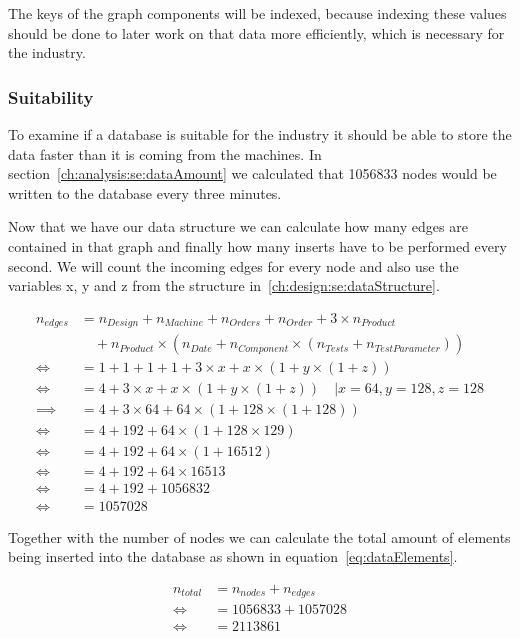 The keys of the graph components will be indexed,
because indexing these values should be done to later work on that data more efficiently,
which is necessary for the industry.

\subsubsection{Suitability}
\label{ch:design:se:suitability}
To examine if a database is suitable for the industry it should be able to store the data faster than it is coming from the machines.
In section~\ref{ch:analysis:se:dataAmount} we calculated that 1056833 nodes would be written to the database every three minutes.

Now that we have our data structure we can calculate how many edges are contained in that graph and finally how many inserts have to be performed every second.
We will count the incoming edges for every node and also use the variables x, y and z from the structure in~\ref{ch:design:se:dataStructure}.

\begin{equation}
  \label{eq:dataEdges}
  \begin{aligned}
    n_{edges} &= n_{Design} + n_{Machine} + n_{Orders} + n_{Order} + 3 \times n_{Product} \\
    &\quad + n_{Product} \times (n_{Date} + n_{Component} \times (n_{Tests} + n_{TestParameter})) \\
    \iff &= 1 + 1 + 1 + 1 + 3 \times x + x \times (1 + y \times (1 + z)) \\
    \iff &= 4 + 3 \times x + x \times (1 + y \times (1 + z)) \quad | x = 64, y = 128, z = 128 \\
    \implies &= 4 + 3 \times 64 + 64 \times (1 + 128 \times (1 + 128)) \\
    \iff &= 4 + 192 + 64 \times (1 + 128 \times 129) \\
    \iff &= 4 + 192 + 64 \times (1 + 16512) \\
    \iff &= 4 + 192 + 64 \times 16513 \\
    \iff &= 4 + 192 + 1056832 \\
    \iff &= 1057028
  \end{aligned}
\end{equation}

Together with the number of nodes we can calculate the total amount of elements being inserted into the database as shown in equation~\ref{eq:dataElements}.

\begin{equation}
  \label{eq:dataElements}
  \begin{aligned}
    n_{total} &= n_{nodes} + n_{edges} \\
    \iff &= 1056833 + 1057028 \\
    \iff &= 2113861
  \end{aligned}
\end{equation}

